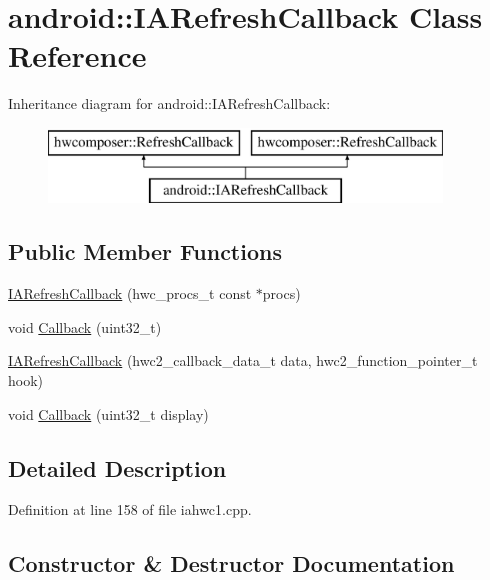 \hypertarget{classandroid_1_1IARefreshCallback}{}\section{android\+:\+:I\+A\+Refresh\+Callback Class Reference}
\label{classandroid_1_1IARefreshCallback}
Inheritance diagram for android\+:\+:I\+A\+Refresh\+Callback\+:\begin{figure}[H]
\begin{center}
\leavevmode
\includegraphics[height=2.000000cm]{classandroid_1_1IARefreshCallback}
\end{center}
\end{figure}
\subsection*{Public Member Functions}
\begin{DoxyCompactItemize}
\item 
\mbox{\hyperlink{classandroid_1_1IARefreshCallback_a2df870a0c492ee9b34800e398e3db2b3}{I\+A\+Refresh\+Callback}} (hwc\+\_\+procs\+\_\+t const $\ast$procs)
\item 
void \mbox{\hyperlink{classandroid_1_1IARefreshCallback_ab43c3e9561417b640ff0091265097c4c}{Callback}} (uint32\+\_\+t)
\item 
\mbox{\hyperlink{classandroid_1_1IARefreshCallback_a21b1a0c87a4c494754c203adcb91fc34}{I\+A\+Refresh\+Callback}} (hwc2\+\_\+callback\+\_\+data\+\_\+t data, hwc2\+\_\+function\+\_\+pointer\+\_\+t hook)
\item 
void \mbox{\hyperlink{classandroid_1_1IARefreshCallback_a7828a460befba5fc2cf3e9e5274b4e6f}{Callback}} (uint32\+\_\+t display)
\end{DoxyCompactItemize}


\subsection{Detailed Description}


Definition at line 158 of file iahwc1.\+cpp.



\subsection{Constructor \& Destructor Documentation}
\mbox{\label{classandroid_1_1IARefreshCallback_a2df870a0c492ee9b34800e398e3db2b3}} 
